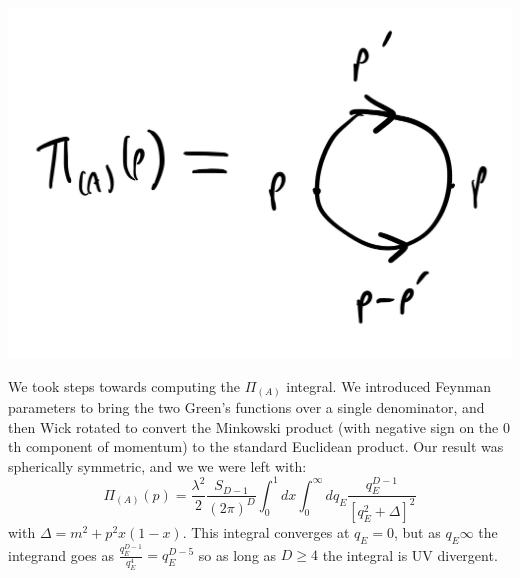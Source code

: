 \begin{center}
    \includegraphics[scale=0.3]{Lectures/Figures/lec13-selfenergy.png}
\end{center}

We took steps towards computing the $\Pi_{(A)}$ integral. We introduced Feynman parameters to bring the two Green's functions over a single denominator, and then Wick rotated to convert the Minkowski product (with negative sign on the $0$th component of momentum) to the standard Euclidean product. Our result was spherically symmetric, and we we were left with:
\begin{equation}
    \Pi_{(A)}(p) = \frac{\lambda^2}{2}\frac{S_{D-1}}{(2\pi)^D}\int_0^1 dx \int_0^\infty dq_E \frac{q_E^{D-1}}{[q_E^2 + \Delta]^2}
\end{equation}
with $\Delta = m^2 +p^2x(1-x)$. This integral converges at $q_E = 0$, but as $q_E \infty$ the integrand goes as $\frac{q_E^{D-1}}{q_E^4} = q_E^{D-5}$ so as long as $D \geq 4$ the integral is UV divergent.

